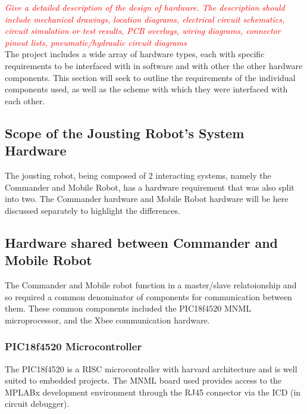 \documentclass[11pt,a4paper]{article}
\begin{document}
  \textcolor{red}
  {
  \textit{Give a detailed description of the design of hardware. The description should include mechanical drawings, location diagrams, electrical circuit schematics, circuit simulation or test results, PCB overlays, wiring diagrams, connector pinout lists, pneumatic/hydraulic circuit diagrams}
  }
  \\The project includes a wide array of hardware types, each with specific requirements to be interfaced with in software and with other the other hardware components. This section will seek to outline the requirements of the individual components used, as well as the scheme with which they were interfaced with each other.

  \subsection{Scope of the Jousting Robot's System Hardware}
    The jousting robot, being composed of 2 interacting systems, namely the Commander and Mobile Robot, has a hardware requirement that was also split into two.
    The Commander hardware and Mobile Robot hardware will be here discussed separately to highlight the differences.
  \subsection{Hardware shared between Commander and Mobile Robot}
    The Commander and Mobile robot function in a master/slave relatoionship and so required a common denominator of components for communication between them. These common components included the PIC18f4520 MNML microprocessor, and the Xbee communication hardware.
    \subsubsection{PIC18f4520 Microcontroller}
    The PIC18f4520 is a RISC microcontroller with harvard architecture and is well suited to embedded projects. The MNML board used provides access to the MPLABx development environment through the RJ45 connector via the ICD (in circuit debugger).
\end{document}
